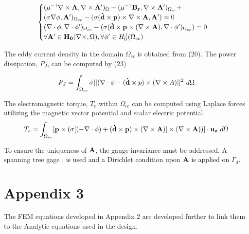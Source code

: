 \documentclass[lettersize,journal]{IEEEtran}
\begin{document}
\begin{equation}
\begin{aligned} 
\begin{cases}
(\mu^{-1}\nabla \times \bold{A},\nabla \times \bold{A'})_{\Omega}-(\mu^{-1}\bold{B_r},\nabla \times \bold{A'})_{\Omega_m} +\\ (\sigma \nabla \phi,\bold{A'})_{\Omega_{cc}} - (\sigma(\bold{\dot{d}}\times \bold{p}) \times \nabla \times \bold{A}, \bold{A'}) = 0\\
(\nabla \cdot \phi,\nabla \cdot \phi')_{\Omega_{cc}} - (\sigma(\bold{\dot{d}}\times \bold{p} \times (\nabla \times \bold{A}), \nabla \cdot \phi')_{\Omega_{cc}}) = 0 \\
\forall \bold{A'} \in \bold{H_0} (\nabla \times,\Omega), \forall \phi' \in H_0^1(\Omega_{cc})
\end{cases} 
\end{aligned}
\end{equation} 

The eddy current density in the domain $\Omega_{cc}$ is obtained from (20). The power dissipation, $P_J$, can be computed by (23)

\begin{equation}
P_J = \int_{\Omega_{cc}} \sigma || (\nabla\cdot \phi -(\bold{\dot{d}} \times p) \times (\nabla \times A)||^2\  d\Omega
\end{equation}


The electromagnetic torque, $T_{e}$ within $\Omega_{cc}$ can be computed using Laplace forces utilizing the magnetic vector potential and scalar electric potential.
\begin{equation}
T_{e} = \int_{\Omega_{cc}} [\bold{p} \times (\sigma [(-\nabla \cdot \phi) + (\bold{\dot{d}}\times \bold{p}) \times (\nabla \times \bold{A})]\times (\nabla \times \bold{A}) )]\cdot \bold{u_z}\ d\Omega
\end{equation}

To ensure the uniqueness of $\bold{A}$, the gauge invariance must be addressed. A spanning tree gage \cite{fontchastagner_2017_axialfield},\cite{dular_1995_a} is used and a Dirichlet condition \cite{Creuse2019-sz} upon $\bold{A}$ is applied on $\Gamma_d$.

\section{Appendix 3}
The FEM equations developed in Appendix 2 are developed further to link them to the Analytic equations used in the design.
\end{document}
